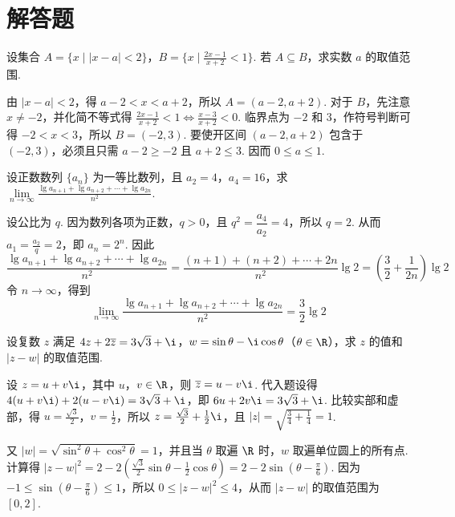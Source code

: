 \section{解答题}

\begin{problem}
设集合 \(A = \{x\mid |x - a| < 2\}\)，\(B = \{x\mid \frac{2x - 1}{x + 2} < 1\}\). 若 \(A \subseteq B\)，求实数 \(a\) 的取值范围.
\end{problem}

\begin{solution}
由 \(|x-a|<2\)，得 \(a-2<x<a+2\)，所以 \(A=(a-2,a+2)\). 对于 \(B\)，先注意 \(x\ne-2\)，并化简不等式得
\(\frac{2x-1}{x+2}<1\Longleftrightarrow\frac{x-3}{x+2}<0\). 临界点为 \(-2\) 和 \(3\)，作符号判断可得 \(-2<x<3\)，所以 \(B=(-2,3)\). 要使开区间 \((a-2,a+2)\) 包含于 \((-2,3)\)，必须且只需 \(a-2\geq-2\) 且 \(a+2\leq3\). 因而 \(0\leq a\leq1\).
\end{solution}

\begin{problem}
设正数数列 \(\{a_{n}\} \) 为一等比数列，且 \(a_{2}=4\)，\(a_{4}=16\)，求 \(\displaystyle\lim\limits_{n\to\infty}\frac{\lg a_{n+1}+\lg a_{n+2}+\cdots+\lg a_{2n}}{n^{2}} \).
\end{problem}

\begin{solution}
设公比为 \(q\). 因为数列各项为正数，\(q>0\)，且 \(q^{2}=\dfrac{a_{4}}{a_{2}}=4\)，所以 \(q=2\). 从而 \(a_{1}=\frac{a_{2}}{q}=2\)，即 \(a_n=2^n\). 因此
\[
\frac{\lg a_{n+1}+\lg a_{n+2}+\cdots+\lg a_{2n}}{n^2}=\frac{(n+1)+(n+2)+\cdots+2n}{n^2}\lg2=\left(\frac32+\frac{1}{2n}\right)\lg2
\]
令 \(n\to\infty\)，得到
\[
\displaystyle\lim_{n\to\infty}\frac{\lg a_{n+1}+\lg a_{n+2}+\cdots+\lg a_{2n}}{n^2}=\frac32\lg2
\]
\end{solution}

\begin{problem}
设复数 \(z\) 满足 \(4z + 2\overline{z} = 3\sqrt{3} + \i\)，\(w = \sin\theta - \i\cos\theta\)（\(\theta \in \R\)），求 \(z\) 的值和 \(|z - w| \) 的取值范围.
\end{problem}

\begin{solution}
设 \(z=u+v\i\)，其中 \(u\)，\(v\in\R\)，则 \(\overline z=u-v\i\). 代入题设得
\(4(u+v\i)+2(u-v\i)=3\sqrt3+\i\)，即 \(6u+2v\i=3\sqrt3+\i\). 比较实部和虚部，得 \(u=\frac{\sqrt3}{2}\)，\(v=\frac12\)，所以
\(z=\frac{\sqrt3}{2}+\frac12\i\)，且 \(|z|=\sqrt{\frac34+\frac14}=1\).

又 \(|w|=\sqrt{\sin^2\theta+\cos^2\theta}=1\)，并且当 \(\theta\) 取遍 \(\R\) 时，\(w\) 取遍单位圆上的所有点. 计算得
\(|z-w|^2=2-2\left(\frac{\sqrt3}{2}\sin\theta-\frac12\cos\theta\right)=2-2\sin\left(\theta-\frac{\pi}{6}\right)\). 因为 \(-1\leqslant\sin\left(\theta-\frac{\pi}{6}\right)\leqslant1\)，所以 \(0\leqslant|z-w|^2\leqslant4\)，从而 \(|z-w|\) 的取值范围为 \([0,2]\).
\end{solution}

